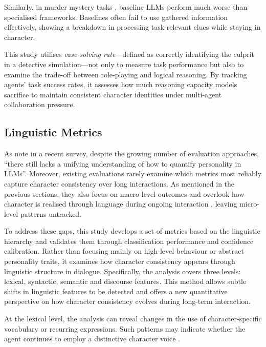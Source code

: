 \documentclass{article}
\begin{document}
Similarly, in murder mystery tasks \citep{wu2024jubensha, zhu2024player}, baseline LLMs perform much worse than specialised frameworks. Baselines often fail to use gathered information effectively, showing a breakdown in processing task-relevant clues while staying in character.

This study utilises \emph{case-solving rate}—defined as correctly identifying the culprit in a detective simulation—not only to measure task performance but also to examine the trade-off between role-playing and logical reasoning. By tracking agents' task success rates, it assesses how much reasoning capacity models sacrifice to maintain consistent character identities under multi-agent collaboration pressure.


\subsection{Linguistic Metrics} \label{sec:background_lingmetric}

As \citet{tseng2024two} note in a recent survey, despite the growing number of evaluation approaches, “there still lacks a unifying understanding of how to quantify personality in LLMs”. Moreover, existing evaluations rarely examine which metrics most reliably capture character consistency over long interactions. As mentioned in the previous sections, they also focus on macro-level outcomes and overlook how character is realised through language during ongoing interaction \citep{shao2023characterllm, wang2024incharacter, wu2024jubensha}, leaving micro-level patterns untracked.

To address these gaps, this study develops a set of metrics based on the linguistic hierarchy and validates them through classification performance and confidence calibration. Rather than focusing mainly on high-level behaviour or abstract personality traits, it examines how character consistency appears through linguistic structure in dialogue. Specifically, the analysis covers three levels: lexical, syntactic, semantic and discourse features. This method allows subtle shifts in linguistic features to be detected and offers a new quantitative perspective on how character consistency evolves during long-term interaction.

At the lexical level, the analysis can reveal changes in the use of character-specific vocabulary or recurring expressions. Such patterns may indicate whether the agent continues to employ a distinctive character voice \citep{zhou2023characterglm,wang2024rolellm}.
\end{document}
